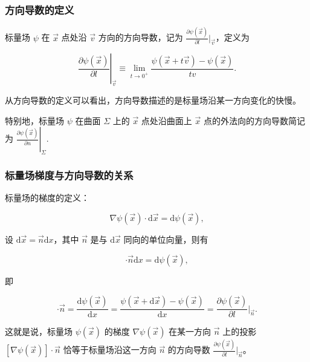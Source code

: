 \subsubsection{方向导数的定义}

标量场 $\psi $ 在 $\vec{x} $ 点处沿 $\vec{v} $ 方向的方向导数，记为 $\displaystyle{\frac{\partial \psi(\vec{x}) }{\partial l }\bigg|_{\vec{v}}  }$，定义为

\begin{equation}
\left. \frac{\partial \psi(\vec{x}) }{\partial l }\right|_{\vec{v}}
\equiv \lim_{t\to 0^+} \frac{\psi(\vec{x} + t\vec{v}) - \psi(\vec{x}) }{tv }.
\end{equation}

从方向导数的定义可以看出，方向导数描述的是标量场沿某一方向变化的快慢。

特别地，标量场 $\psi $ 在曲面 $\Sigma $ 上的 $\vec{x} $ 点处沿曲面上 $\vec{x} $ 点的外法向的方向导数简记为 $\displaystyle{\left. \frac{\partial\psi(\vec{x}) }{\partial n }\right|_{\Sigma}. }$ 

\subsubsection{标量场梯度与方向导数的关系}

标量场的梯度的定义：

\begin{equation}
\nabla\psi(\vec{x})\cdot\mathrm{d}\vec{x}
=\mathrm{d}\psi(\vec{x}),
\end{equation}

设 $\mathrm{d}\vec{x} = \vec{n} \mathrm{d}x $，其中 $\vec{n} $ 是与 $\mathrm{d}\vec{x} $ 同向的单位向量，则有

\begin{equation}
[\nabla\psi(\vec{x})] \cdot \vec{n} \mathrm{d}x
=\mathrm{d}\psi(\vec{x}),
\end{equation}

即

\begin{equation}
[\nabla\psi(\vec{x})] \cdot \vec{n}
=\frac{\mathrm{d}\psi(\vec{x}) }{\mathrm{d}x }
=\frac{\psi(\vec{x}+\mathrm{d}\vec{x}) - \psi(\vec{x}) }{\mathrm{d}x }
=\frac{\partial \psi(\vec{x}) }{\partial l }\bigg|_{\vec{n}}.
\end{equation}

这就是说，标量场 $\psi(\vec{x}) $ 的梯度 $\nabla\psi(\vec{x}) $ 在某一方向 $\vec{n} $ 上的投影 $[\nabla\psi(\vec{x})]\cdot\vec{n} $ 恰等于标量场沿这一方向 $\vec{n} $ 的方向导数 $\displaystyle{\frac{\partial \psi(\vec{x}) }{\partial l }\bigg|_{\vec{n}}  }$。

